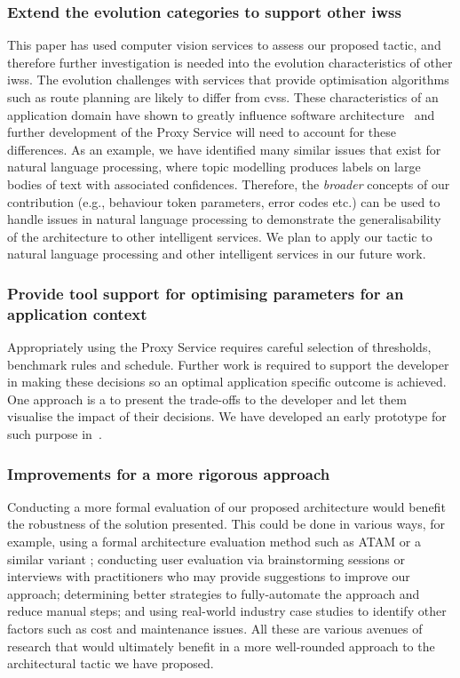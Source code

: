 \subsubsection{Extend the evolution categories to support other \glspl{iws}} This paper has used computer vision services to assess our proposed tactic, and therefore further investigation is needed into the evolution characteristics of other \glspl{iws}. The evolution challenges with services that provide optimisation algorithms such as route planning are likely to differ from \glspl{cvs}. These characteristics of an application domain have shown to greatly influence software architecture~\citep{Barnett:2018Kx} and further development of the Proxy Service will need to account for these differences. As an example, we have identified many similar issues that exist for natural language processing, where topic modelling produces labels on large bodies of text with associated confidences. Therefore, the \textit{broader} concepts of our contribution (e.g., behaviour token parameters, error codes etc.) can be used to handle issues in natural language processing to demonstrate the generalisability of the architecture to other intelligent services. We plan to apply our tactic to natural language processing and other intelligent services  in our future work.

\subsubsection{Provide tool support for optimising parameters for an application context} Appropriately using the Proxy Service requires careful selection of thresholds, benchmark rules and schedule. Further work is required to support the developer in making these decisions so an optimal application specific outcome is achieved. One approach is a to present the trade-offs to the developer and let them visualise the impact of their decisions. We have developed an early prototype for such purpose in~\citep{Cummaudo:2020fse-demo}.

\subsubsection{Improvements for a more rigorous approach} Conducting a more formal evaluation of our proposed architecture would benefit the robustness of the solution presented. This could be done in various ways, for example, using a formal architecture evaluation method such as ATAM \citep{Kazman2000} or a similar variant \citep{Bouwers2010}; conducting user evaluation via brainstorming sessions or interviews with practitioners who may provide suggestions to improve our approach; determining better strategies to fully-automate the approach and reduce manual steps; and using real-world industry case studies to identify other factors such as cost and maintenance issues. All these are various avenues of research that would ultimately benefit in a more well-rounded approach to the architectural tactic we have proposed.


